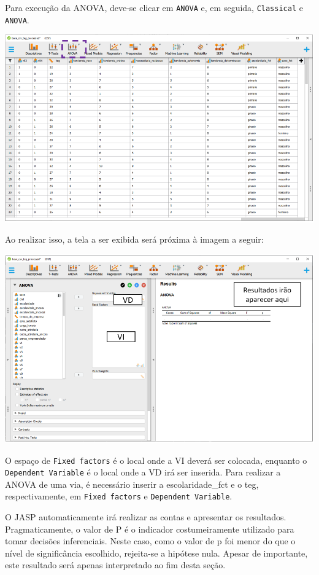 \documentclass[
]{book}
\begin{document}
Para execução da ANOVA, deve-se clicar em \texttt{ANOVA} e, em seguida, \texttt{Classical} e \texttt{ANOVA}.

\includegraphics{./img/cap_anova_interface.png}

Ao realizar isso, a tela a ser exibida será próxima à imagem a seguir:

\includegraphics{./img/cap_anova_interface2.png}

O espaço de \texttt{Fixed\ factors} é o local onde a VI deverá ser colocada, enquanto o \texttt{Dependent\ Variable} é o local onde a VD irá ser inserida. Para realizar a ANOVA de uma via, é necessário inserir a escolaridade\_fct e o teg, respectivamente, em \texttt{Fixed\ factors} e \texttt{Dependent\ Variable}.

O JASP automaticamente irá realizar as contas e apresentar os resultados. Pragmaticamente, o valor de P é o indicador costumeiramente utilizado para tomar decisões inferenciais. Neste caso, como o valor de p foi menor do que o nível de significância escolhido, rejeita-se a hipótese nula. Apesar de importante, este resultado será apenas interpretado ao fim desta seção.
\end{document}
